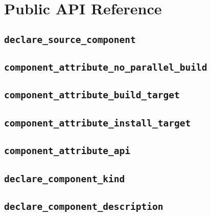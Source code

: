 %
%
%
%
\chapter{Public API Reference}
\section{\texttt{declare\_source\_component}}

\section{\texttt{component\_attribute\_no\_parallel\_build}}\label{api:component-attribute-no-parallel-build}
\section{\texttt{component\_attribute\_build\_target}}\label{api:component-attribute-build-target}
\section{\texttt{component\_attribute\_install\_target}}\label{api:component-attribute-install-target}
\section{\texttt{component\_attribute\_api}}\label{api:component-attribute-api}
\section{\texttt{declare\_component\_kind}}\label{api:declare-component-kind}
\section{\texttt{declare\_component\_description}}\label{api:declare-component-description}
